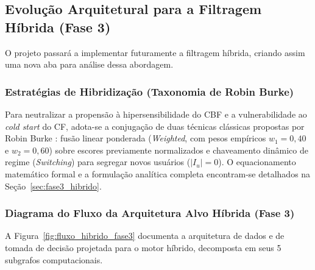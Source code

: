 \subsection{Evolução Arquitetural para a Filtragem Híbrida (Fase 3)}

O projeto passará a implementar futuramente a filtragem híbrida, criando assim uma nova aba para análise dessa abordagem.

\subsubsection{Estratégias de Hibridização (Taxonomia de Robin Burke)}

Para neutralizar a propensão à hipersensibilidade do CBF e a vulnerabilidade ao \textit{cold start} do CF, adota-se a conjugação de duas técnicas clássicas propostas por Robin Burke \cite{burke2002}: fusão linear ponderada (\textit{Weighted}, com pesos empíricos $w_1 = 0{,}40$ e $w_2 = 0{,}60$) sobre escores previamente normalizados e chaveamento dinâmico de regime (\textit{Switching}) para segregar novos usuários ($|I_u| = 0$). O equacionamento matemático formal e a formulação analítica completa encontram-se detalhados na Seção~\ref{sec:fase3_hibrido}.

\subsubsection{Diagrama do Fluxo da Arquitetura Alvo Híbrida (Fase 3)}

A Figura~\ref{fig:fluxo_hibrido_fase3} documenta a arquitetura de dados e de tomada de decisão projetada para o motor híbrido, decomposta em seus 5 subgrafos computacionais.

